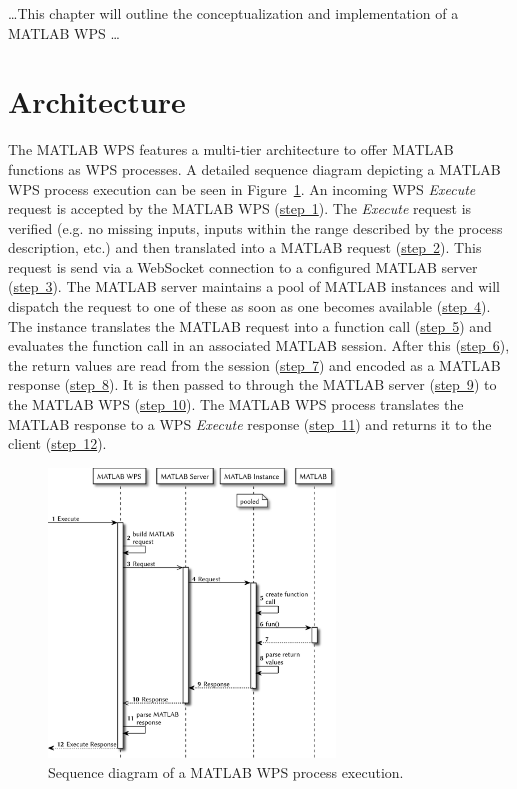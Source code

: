 	\dots This chapter will outline the conceptualization and implementation of a MATLAB WPS \dots

	

	\section{Architecture}
		The MATLAB WPS features a multi-tier architecture to offer MATLAB functions as \acl{WPS} processes. A detailed sequence diagram depicting a MATLAB WPS process execution can be seen in Figure~\ref{fig:sd:mwps}. An incoming WPS \emph{Execute} request is accepted by the MATLAB WPS (\hyperref[fig:sd:mwps]{step~1}). The \emph{Execute} request is verified (e.g. no missing inputs, inputs within the range described by the process description, etc.) and then translated into a MATLAB request (\hyperref[fig:sd:mwps]{step~2}). This request is send via a WebSocket connection to a configured MATLAB server (\hyperref[fig:sd:mwps]{step~3}). The MATLAB server maintains a pool of MATLAB instances and will dispatch the request to one of these as soon as one becomes available (\hyperref[fig:sd:mwps]{step~4}). The instance translates the MATLAB request into a function call (\hyperref[fig:sd:mwps]{step~5}) and evaluates the function call in an associated MATLAB session. After this (\hyperref[fig:sd:mwps]{step~6}), the return values are read from the session (\hyperref[fig:sd:mwps]{step~7}) and encoded as a MATLAB response (\hyperref[fig:sd:mwps]{step~8}). It is then passed to through the MATLAB server (\hyperref[fig:sd:mwps]{step~9}) to the MATLAB WPS (\hyperref[fig:sd:mwps]{step~10}). The MATLAB WPS process translates the MATLAB response to a WPS \emph{Execute} response (\hyperref[fig:sd:mwps]{step~11}) and returns it to the client (\hyperref[fig:sd:mwps]{step~12}).

		\begin{figure}[!htb]
			\centering
			\includegraphics[width=0.6788732394366197\textwidth]{figures/sequence-diagramm-mwps.pdf}
			\caption{\label{fig:sd:mwps}Sequence diagram of a MATLAB WPS process execution.}
		\end{figure}

